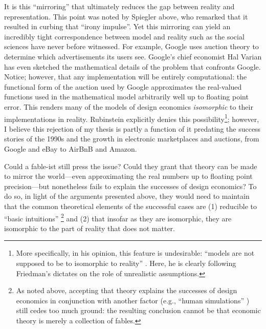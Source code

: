 It is this ``mirroring'' that ultimately reduces the gap between reality and representation. This point was noted by Spiegler \autocite*{spiegler2024} above, who remarked that it resulted in curbing that ``irony impulse''. Yet this mirroring can yield an incredibly tight correspondence between model and reality such as the social sciences have never before witnessed. For example, Google uses auction theory to determine which advertisements its users see. Google's chief economist Hal Varian \autocite*{varian2009} has even sketched the mathematical details of the problem that confronts Google. Notice; however, that any implementation will be entirely computational: the functional form of the auction used by Google approximates the real-valued functions used in the mathematical model arbitrarily well up to floating point error. This renders many of the models of design economics \textit{isomorphic} to their implementations in reality. Rubinstein \autocite*{rubinstein1991} explicitly denies this possibility\footnote{More specifically, in his opinion, this feature is undesirable: ``models are not supposed to be to isomorphic to reality'' \autocite[918]{rubinstein1991}. Here, he is clearly following Friedman's \autocite*{friedman1953} dictates on the role of unrealistic assumptions.}; however, I believe this rejection of my thesis is partly a function of it predating the success stories of the 1990s and the growth in electronic marketplaces and auctions, from Google and eBay to AirBnB and Amazon.

Could a fable-ist still press the issue? Could they grant that theory can be made to mirror the world---even approximating the real numbers up to floating point precision---but nonetheless fails to explain the successes of design economics? To do so, in light of the arguments presented above, they would need to maintain that the common theoretical elements of the successful cases are (1) reducible to ``basic intuitions'' \autocite[above]{rubinstein2012}\footnote{As noted above, accepting that theory explains the successes of design economics in conjunction with another factor (e.g., ``human simulations'' \autocite[above]{rubinstein2012}) still cedes too much ground: the resulting conclusion cannot be that economic theory is merely a collection of fables.} and (2) that insofar as they are isomorphic, they are isomorphic to the part of reality that does not matter.

